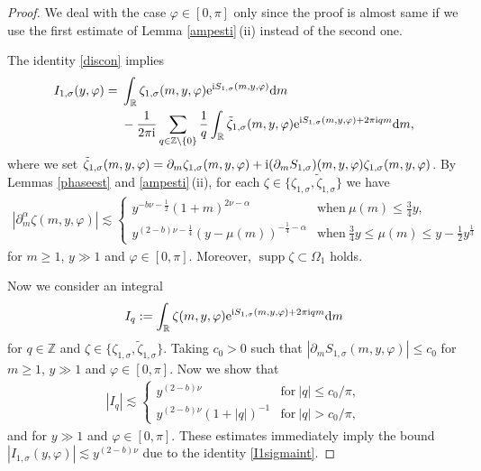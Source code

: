 \documentclass[pdftex]{sigma}
\numberwithin{equation}{section}
\def\R{\mathbb{R}}%
\DeclareMathOperator{\supp}{supp}%
\def\a{\alpha}
\def\f{\varphi}
\def\m{\mu}
\def\n{\nu}
\def\s{\sigma}
\def\z{\zeta}
\def\pa{\partial}
\begin{document}
\begin{proof}
We deal with the case $\f\in [0,\pi]$ only since the proof is almost same if we use the first estimate of Lemma \ref{ampesti}\,(ii) instead of the second one.

The identity \eqref{discon} implies
\begin{align}
I_{1,\s}(y,\f)={}&\int_{\R}\z_{1,\s}(m,y,\f){\rm e}^{{\rm i}S_{1,\s}(m,y,\f)}{\rm d}m\nonumber\\
&-\frac{1}{2\pi {\rm i}}\sum_{q\in\mathbb{Z}\setminus \{0\}}\frac{1}{q}\int_{\R}\tilde{\z}_{1,\s}(m,y,\f){\rm e}^{{\rm i}S_{1,\s}(m,y,\f)+2\pi {\rm i}qm}{\rm d}m,\label{I1sigmaint}
\end{align}
where we set
$
\tilde{\z}_{1,\s}(m,y,\f)=\pa_m\z_{1,\s}(m,y,\f)+{\rm i}(\pa_mS_{1,\s})(m,y,\f)\z_{1,\s}(m,y,\f)$.
By Lemmas \ref{phaseest} and \ref{ampesti}\,(ii), for each $\z\in \big\{\z_{1,\s},\tilde{\z}_{1,\s}\big\}$ we have
\begin{align}\label{sevzetaest}
|\pa_{m}^{\a}\z(m,y,\f)|\lesssim \begin{cases} y^{-b\n-\frac{1}{2}}(1+m)^{2\n-\a} & \text{when}\  \m(m)\leq \frac{3}{4}y, \\
y^{(2-b)\n-\frac{1}{4}} (y-\m(m))^{-\frac{1}{4}-\a}& \text{when}\  \frac{3}{4}y\leq \m(m)\leq y-\frac{1}{2}y^{\frac{1}{3}}
\end{cases}
\end{align}
for $m\geq 1$, $y\gg1$ and $\f\in [0,\pi]$. Moreover, $\supp \z\subset \Omega_1$ holds.

Now we consider an integral
\[%
I_q:=\int_{\R}\z(m,y,\f){\rm e}^{{\rm i}S_{1,\s}(m,y,\f)+2\pi {\rm i}qm}{\rm d}m
\]
for $q\in\mathbb{Z}$ and $\z\in \{\z_{1,\s},\tilde{\z}_{1,\s}\}$. Taking $c_0>0$ such that $|\pa_mS_{1,\s}(m,y,\f)|\leq c_0$ for $m\geq 1$, $y\gg 1$ and $\f\in [0,\pi]$. Now we show that
\begin{align*}%
|I_q|\lesssim \begin{cases}
y^{(2-b)\n} & \text{for}\  |q|\leq c_0/\pi,\\
y^{(2-b)\n}(1+|q|)^{-1}& \text{for}\  |q|> c_0/\pi,
\end{cases}
\end{align*}
and for $y\gg 1$ and $\f\in [0,\pi]$.
These estimates immediately imply the bound $|I_{1,\s}(y,\f)|\lesssim y^{(2-b)\n}$ due to the identity \eqref{I1sigmaint}.


\end{proof}
\end{document}
